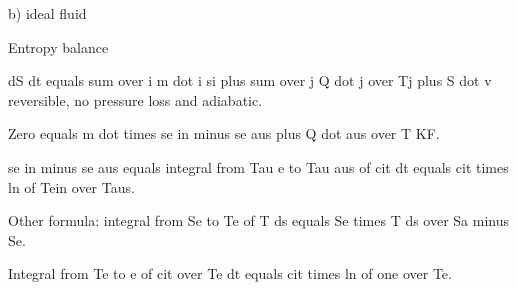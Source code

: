 b) ideal fluid

Entropy balance

dS dt equals sum over i m dot i si plus sum over j Q dot j over Tj plus S dot v reversible, no pressure loss and adiabatic.

Zero equals m dot times se in minus se aus plus Q dot aus over T KF.

se in minus se aus equals integral from Tau e to Tau aus of cit dt equals cit times ln of Tein over Taus.

Other formula: integral from Se to Te of T ds equals Se times T ds over Sa minus Se.

Integral from Te to e of cit over Te dt equals cit times ln of one over Te.